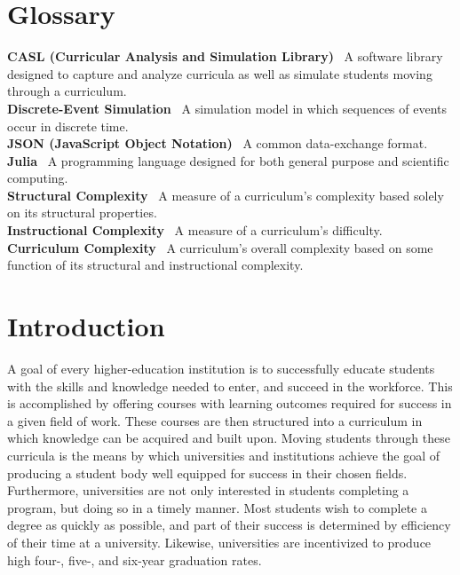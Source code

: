 \documentclass[botnum, fleqn]{unmeethesis}
\begin{document}
\tableofcontents
\listoffigures


\chapter{Glossary}
  \textbf{CASL (Curricular Analysis and Simulation Library)} \ A software library designed to capture and analyze curricula as well as simulate students moving through a curriculum. \\
  \textbf{Discrete-Event Simulation} \ A simulation model in which sequences of events occur in discrete time. \\
  \textbf{JSON (JavaScript Object Notation)} \ A common data-exchange format. \\
  \textbf{Julia} \ A programming language designed for both general purpose and scientific computing. \\
  \textbf{Structural Complexity} \ A measure of a curriculum's complexity based solely on its structural properties. \\
  \textbf{Instructional Complexity} \ A measure of a curriculum's difficulty. \\
  \textbf{Curriculum Complexity} \ A curriculum's overall complexity based on some function of its structural and instructional complexity. \\


\mainmatter


\chapter{Introduction}
  A goal of every higher-education institution is to successfully educate students with the skills and knowledge needed to enter, and succeed in the workforce. This is accomplished by offering courses with learning outcomes required for success in a given field of work. These courses are then structured into a curriculum in which knowledge can be acquired and built upon. Moving students through these curricula is the means by which universities and institutions achieve the goal of producing a student body well equipped for success in their chosen fields. Furthermore, universities are not only interested in students completing a program, but doing so in a timely manner. Most students wish to complete a degree as quickly as possible, and part of their success is determined by efficiency of their time at a university. Likewise, universities are incentivized to produce high four-, five-, and six-year graduation rates.
\end{document}
